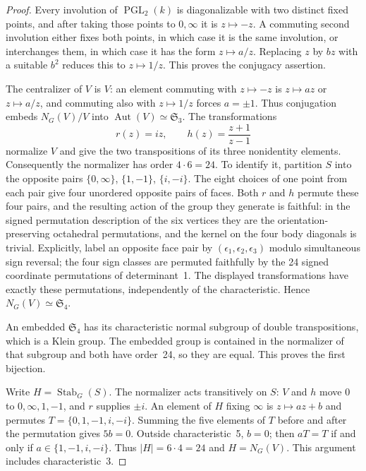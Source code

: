 \begin{proof}
Every involution of $\operatorname{PGL}_2(k)$ is diagonalizable with two
distinct fixed points, and after taking those points to $0,\infty$ it is
$z\mapsto-z$. A commuting second involution either fixes both points,
in which case it is the same involution, or interchanges them, in which
case it has the form $z\mapsto a/z$. Replacing $z$ by $bz$ with a suitable
$b^2$ reduces this to $z\mapsto1/z$. This proves the conjugacy assertion.

The centralizer of $V$ is $V$: an element commuting with $z\mapsto-z$
is $z\mapsto az$ or $z\mapsto a/z$, and commuting also with
$z\mapsto1/z$ forces $a=\pm1$. Thus conjugation embeds
$N_G(V)/V$ into $\operatorname{Aut}(V)\simeq\mathfrak S_3$.
The transformations
\[
 r(z)=iz,\qquad h(z)=\frac{z+1}{z-1}
\]
normalize $V$ and give the two transpositions of its three nonidentity
elements. Consequently the normalizer has order $4\cdot6=24$.
To identify it, partition $S$ into the opposite pairs
$\{0,\infty\}$, $\{1,-1\}$, $\{i,-i\}$. The eight choices of one point
from each pair give four unordered opposite pairs of faces. Both $r$
and $h$ permute these four pairs, and the resulting action of the group
they generate is faithful: in the signed permutation description of the
six vertices they are the orientation-preserving octahedral permutations,
and the kernel on the four body diagonals is trivial. Explicitly, label
an opposite face pair by $(\epsilon_1,\epsilon_2,\epsilon_3)$ modulo
simultaneous sign reversal; the four sign classes are permuted faithfully
by the 24 signed coordinate permutations of determinant~1. The displayed
transformations have exactly these permutations, independently of the
characteristic. Hence $N_G(V)\simeq\mathfrak S_4$.

An embedded $\mathfrak S_4$ has its characteristic normal subgroup of
double transpositions, which is a Klein group. The embedded group is
contained in the normalizer of that subgroup and both have order~24,
so they are equal. This proves the first bijection.

Write $H=\operatorname{Stab}_G(S)$. The normalizer acts transitively on
$S$: $V$ and $h$ move $0$ to $0,\infty,1,-1$, and $r$ supplies $\pm i$.
An element of $H$ fixing $\infty$ is $z\mapsto az+b$ and permutes
$T=\{0,1,-1,i,-i\}$. Summing the five elements of $T$ before and after
the permutation gives $5b=0$. Outside characteristic~5, $b=0$; then
$aT=T$ if and only if $a\in\{1,-1,i,-i\}$. Thus $|H|=6\cdot4=24$
and $H=N_G(V)$. This argument includes characteristic~3.


\end{proof}
